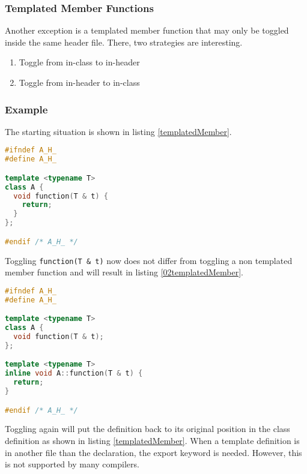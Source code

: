 \subsubsection{Templated Member Functions}

Another exception is a templated member function that may only be toggled
inside the same header file. There, two strategies are interesting.
\begin{enumerate}
\item Toggle from in-class to in-header
\item Toggle from in-header to in-class
\end{enumerate}

\subsubsection*{Example}
\label{templatedmember}

The starting situation is shown in listing \ref{templatedMember}.

\begin{lstlisting}[caption={A.h, \textit{in-class} definition with template parameters},
label={templatedMember}, language=C++]
#ifndef A_H_
#define A_H_

template <typename T>
class A {
  void function(T & t) {
    return;
  }
};

#endif /* A_H_ */
\end{lstlisting}

Toggling \texttt{function(T \& t)} now does not differ from toggling a non
templated member function and will result in listing \ref{02templatedMember}.

\begin{lstlisting}[caption={A.h, \textit{in-header} definition with template parameters},
label={02templatedMember}, language=C++]
#ifndef A_H_
#define A_H_

template <typename T>
class A {
  void function(T & t);
};

template <typename T>
inline void A::function(T & t) {
  return;
}

#endif /* A_H_ */
\end{lstlisting}

Toggling again will put the definition back to its original position in the
class definition as shown in listing \ref{templatedMember}. When a
template definition is in another file than the declaration, the export
keyword is needed. However, this is not supported by many compilers.

